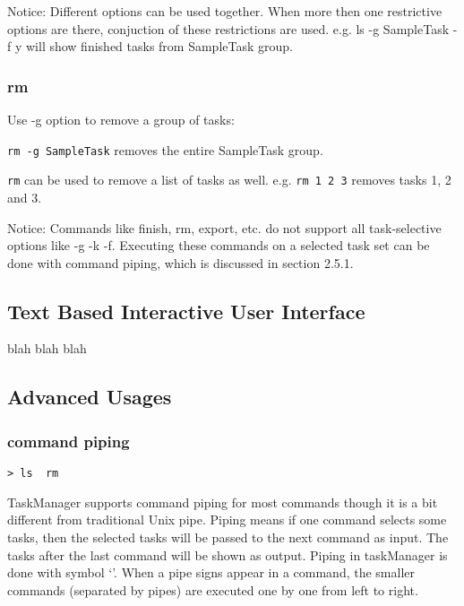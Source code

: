 \documentclass[12pt, a4paper]{article}
\begin{document}
Notice: Different options can be used together.
        When more then one restrictive options are there, conjuction of these restrictions are used.
        e.g. ls -g SampleTask -f y will show finished tasks from SampleTask group. 

\subsubsection{rm}
Use -g option to remove a group of tasks:

\texttt{rm -g SampleTask} removes the entire SampleTask group.

\texttt{rm} can be used to remove a list of tasks as well. e.g. \texttt{rm 1 2 3} removes tasks 1, 2 and 3.


Notice: Commands like finish, rm, export, etc. do not support all task-selective options like -g -k -f.
Executing these commands on a selected task set can be done with command piping, which is discussed in section 2.5.1.

\subsection{Text Based Interactive User Interface}
blah blah blah

\subsection{Advanced Usages}
\subsubsection{command piping}

\texttt{\textgreater \ ls \textbar \  rm}

TaskManager supports command piping for most commands though it is a bit different from traditional Unix pipe.
Piping means if one command selects some tasks, then the selected tasks will be passed to the next command as input. The tasks after the last command will be shown as output.
Piping in taskManager is done with symbol `\textbar'. When a pipe signs appear in a command, the smaller commands (separated by pipes) are executed one by one from left to right. 
\end{document}

